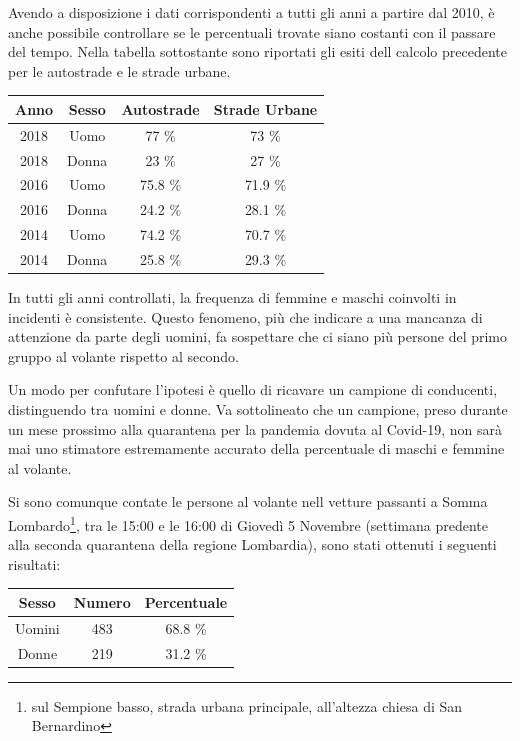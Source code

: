 \documentclass[a4paper,12pt]{report}
\begin{document}
Avendo a disposizione i dati corrispondenti a tutti gli anni a partire dal 2010, 
è anche possibile controllare se le percentuali trovate siano costanti con 
il passare del tempo. 
Nella tabella sottostante sono riportati gli esiti dell calcolo precedente per le 
autostrade e le strade urbane. 

\begin{center}
    \def\arraystretch{1.5}%
    \begin{tabular}{ |c|c|c|c| }
        \hline
        Anno & Sesso & Autostrade & Strade Urbane \\ 
        \hline
        \rowcolor{TableGray}
        2018 & Uomo & 77 \%  & 73 \% \\
        2018 & Donna & 23 \% & 27 \% \\
        \rowcolor{TableGray}
        2016 & Uomo & 75.8 \%  & 71.9 \% \\
        2016 & Donna & 24.2 \% & 28.1 \% \\
        \rowcolor{TableGray}
        2014 & Uomo & 74.2 \%  & 70.7 \% \\
        2014 & Donna & 25.8 \% & 29.3 \% \\
        \hline
    \end{tabular}
\end{center}

In tutti gli anni controllati, la frequenza di femmine e maschi coinvolti 
in incidenti è consistente. 
Questo fenomeno, più che indicare a una mancanza di attenzione da parte degli uomini, 
fa sospettare che ci siano più persone del primo gruppo al volante rispetto al secondo. 

Un modo per confutare l'ipotesi è quello di ricavare un campione di conducenti, 
distinguendo tra uomini e donne. 
Va sottolineato che un campione, preso durante un mese prossimo alla quarantena per 
la pandemia dovuta al Covid-19, non sarà mai uno stimatore estremamente 
accurato della percentuale di maschi e femmine al volante. 

Si sono comunque contate le persone al volante nell vetture passanti a Somma 
Lombardo\footnote{sul Sempione basso, strada urbana principale, 
all'altezza chiesa di San Bernardino}, 
tra le 15:00 e le 16:00 di Giovedì 5 Novembre 
(settimana predente alla seconda quarantena della regione Lombardia), 
sono stati ottenuti i seguenti risultati:

\begin{center}
    \def\arraystretch{1.5}%
    \begin{tabular}{ |c|c|c| }
        \hline
        Sesso & Numero & Percentuale \\ 
        \hline
        \rowcolor{TableGray}
        Uomini & 483 & 68.8 \% \\
        Donne & 219 & 31.2 \% \\
        \hline
    \end{tabular}
\end{center}
\end{document}
